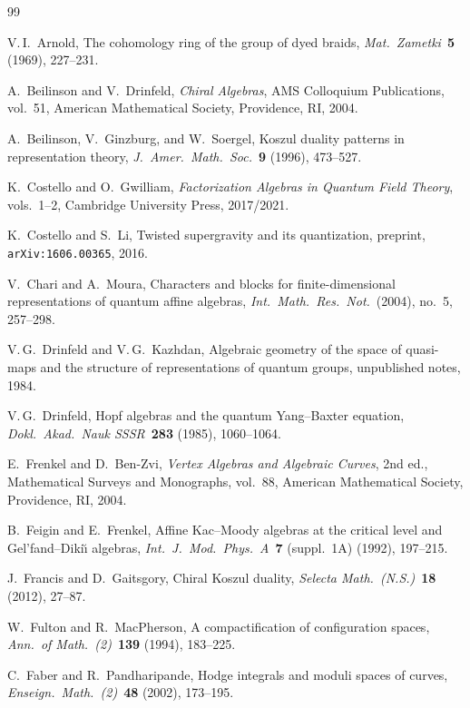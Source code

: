 \documentclass[11pt,reqno]{amsart}
\theoremstyle{definition}
\theoremstyle{remark}
\numberwithin{equation}{section}
\begin{document}
\begin{thebibliography}{99}

V.\,I.~Arnold,
The cohomology ring of the group of dyed braids,
\textit{Mat.\ Zametki}~\textbf{5} (1969), 227--231.

A.~Beilinson and V.~Drinfeld,
\textit{Chiral Algebras},
AMS Colloquium Publications, vol.~51,
American Mathematical Society, Providence, RI, 2004.

A.~Beilinson, V.~Ginzburg, and W.~Soergel,
Koszul duality patterns in representation theory,
\textit{J.~Amer.\ Math.\ Soc.}~\textbf{9} (1996),
473--527.

K.~Costello and O.~Gwilliam,
\textit{Factorization Algebras in Quantum Field Theory},
vols.~1--2, Cambridge University Press, 2017/2021.

K.~Costello and S.~Li,
Twisted supergravity and its quantization,
preprint, \texttt{arXiv:1606.00365}, 2016.

V.~Chari and A.~Moura,
Characters and blocks for finite-dimensional
representations of quantum affine algebras,
\textit{Int.\ Math.\ Res.\ Not.}\ (2004), no.~5,
257--298.

V.\,G.~Drinfeld and V.\,G.~Kazhdan,
Algebraic geometry of the space of quasi-maps
and the structure of representations of quantum groups,
unpublished notes, 1984.

V.\,G.~Drinfeld,
Hopf algebras and the quantum Yang--Baxter equation,
\textit{Dokl.\ Akad.\ Nauk SSSR}~\textbf{283} (1985),
1060--1064.

E.~Frenkel and D.~Ben-Zvi,
\textit{Vertex Algebras and Algebraic Curves},
2nd ed., Mathematical Surveys and Monographs, vol.~88,
American Mathematical Society, Providence, RI, 2004.

B.~Feigin and E.~Frenkel,
Affine Kac--Moody algebras at the critical level and
Gel'fand--Diki\u{\i} algebras,
\textit{Int.\ J.\ Mod.\ Phys.\ A}~\textbf{7}
(suppl.\ 1A) (1992), 197--215.

J.~Francis and D.~Gaitsgory,
Chiral Koszul duality,
\textit{Selecta Math.\ (N.S.)}~\textbf{18} (2012),
27--87.

W.~Fulton and R.~MacPherson,
A compactification of configuration spaces,
\textit{Ann.\ of Math.\ (2)}~\textbf{139} (1994),
183--225.

C.~Faber and R.~Pandharipande,
Hodge integrals and moduli spaces of curves,
\textit{Enseign.\ Math.\ (2)}~\textbf{48} (2002),
173--195.


\end{thebibliography}
\end{document}
